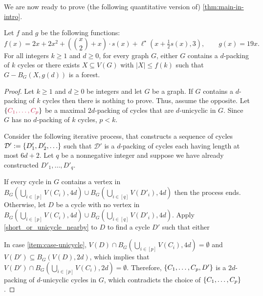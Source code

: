 \documentclass{patmorin}
\newcommand{\gwen}[1]{\textcolor{Purple}{Gwen: #1}}
\DeclarePairedDelimiter\set{\{}{\}}
\begin{document}
We are now ready to prove (the following quantitative version of) \cref{thm:main-in-intro}.

\begin{thm}\label{thm:the-big-ball-of-wax}
  Let $f$ and $g$ be the following functions:
  \[
    \textstyle f(x)=
  2x+2x^2 + (\binom{x}{2}+x)\cdot s(x) + \ell^\star(x+\tfrac{1}{2}s(x),3), \qquad
    g(x)= 19x.
  \]
  For all integers $k\ge 1$ and $d\ge 0$, for every graph $G$, either $G$ contains a $d$-packing of $k$ cycles or there exists $X\subseteq V(G)$ with $|X|\leq f(k)$ such that $G-B_G(X,g(d))$ is a forest.
\end{thm}

\begin{proof}
  Let $k\ge 1$ and $d\ge 0$ be integers and let $G$ be a graph. If $G$ contains a $d$-packing of $k$ cycles then there is nothing to prove. Thus, assume the opposite. Let $\set{\mathdefin{C_1,\ldots,C_p}}$ be a maximal $2d$-packing of cycles that are $d$-unicyclic in $G$.  Since $G$ has no $d$-packing of $k$ cycles, $p<k$.

  Consider the following iterative process, that
  constructs a sequence of cycles 
  $\mathcal{D}':=\set{D'_1,D'_2,\ldots}$ such that $\mathcal{D}'$ is a $d$-packing of cycles each having length at most $6d+2$. Let $q$ be a nonnegative integer and suppose we have already constructed $D'_1,\ldots,D'_{q}$. 

  If every cycle in $G$ contains a vertex in  $B_G(\bigcup_{i\in[p]} V(C_i),4d)\cup B_G(\bigcup_{i\in[q]}V(D'_i),4d)$ then the process ends.  Otherwise, let $D$ be a cycle with no vertex in $B_G(\bigcup_{i\in[p]} V(C_i),4d)\cup B_G(\bigcup_{i\in[q]}V(D'_i),4d)$.   Apply \cref{short_or_unicycle_nearby} to $D$ to find a cycle $D'$ such that either 
   In case \cref{item:case-unicycle},
   $V(D)\cap B_G(\bigcup_{i\in[p]} V(C_i),4d)=\emptyset$ and $V(D')\subseteq B_G(V(D),2d)$, which implies that $V(D')\cap B_G(\bigcup_{i\in[p]} V(C_i),2d)=\emptyset$. Therefore, $\set{C_1,\ldots,C_p,D'}$ is a $2d$-packing of $d$-unicyclic cycles in $G$, which contradicts the choice of $\set{C_1,\ldots,C_p}$.
   

\end{proof}
\end{document}
